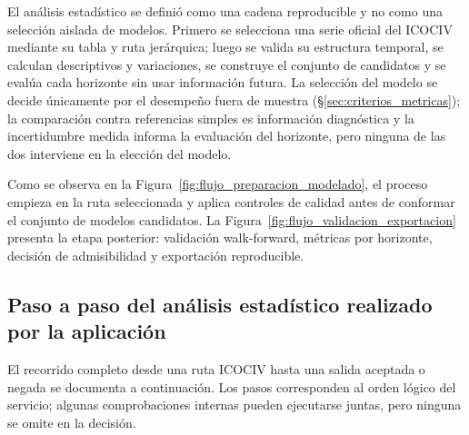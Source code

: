 \documentclass[12pt,letterpaper]{article}
\newcommand{\ICOCIV}{ICOCIV}
\begin{document}
El análisis estadístico se definió como una cadena reproducible y no como una selección aislada de modelos. Primero se selecciona una serie oficial del \ICOCIV{} mediante su tabla y ruta jerárquica; luego se valida su estructura temporal, se calculan descriptivos y variaciones, se construye el conjunto de candidatos y se evalúa cada horizonte sin usar información futura. La selección del modelo se decide únicamente por el desempeño fuera de muestra (§\ref{sec:criterios_metricas}); la comparación contra referencias simples es información diagnóstica y la incertidumbre medida informa la evaluación del horizonte, pero ninguna de las dos interviene en la elección del modelo.

Como se observa en la Figura~\ref{fig:flujo_preparacion_modelado}, el proceso empieza en la ruta seleccionada y aplica controles de calidad antes de conformar el conjunto de modelos candidatos. La Figura~\ref{fig:flujo_validacion_exportacion} presenta la etapa posterior: validación walk-forward, métricas por horizonte, decisión de admisibilidad y exportación reproducible.

\afterpage{%
%
%
}

\subsection{Paso a paso del análisis estadístico realizado por la aplicación}
\label{sec:paso_a_paso_estadistico}

El recorrido completo desde una ruta \ICOCIV{} hasta una salida aceptada o negada se documenta a continuación. Los pasos corresponden al orden lógico del servicio; algunas comprobaciones internas pueden ejecutarse juntas, pero ninguna se omite en la decisión.
\end{document}
